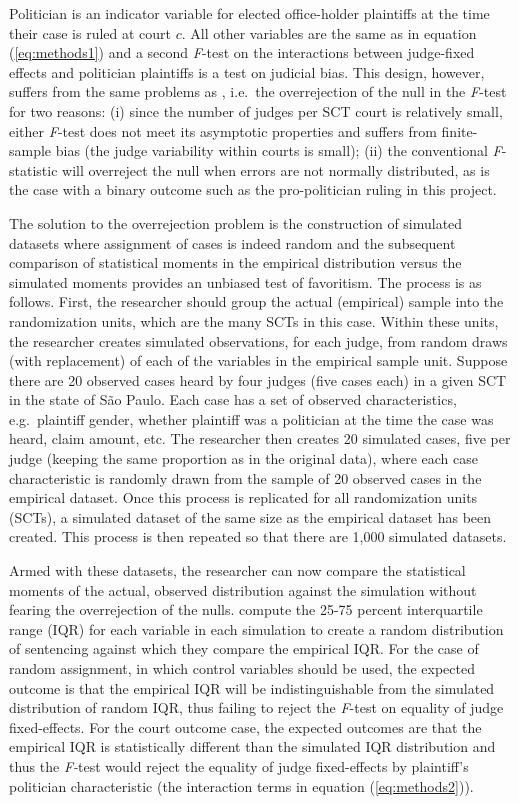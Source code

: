 \documentclass[11pt]{article}
\newcommand{\refp}[1]{(\ref{#1})}
\begin{document}
Politician is an indicator variable for elected office-holder plaintiffs at the time their case is ruled at court $c$. All other variables are the same as in equation \refp{eq:methods1} and a second \emph{F}-test on the interactions between judge-fixed effects and politician plaintiffs is a test on judicial bias. This design, however, suffers from the same problems as \citet{AbramsJudgesVaryTheir2012}, i.e.~the overrejection of the null in the \emph{F}-test for two reasons: (i) since the number of judges per SCT court is relatively small, either \emph{F}-test does not meet its asymptotic properties and suffers from finite-sample bias (the judge variability within courts is small); (ii) the conventional \emph{F}-statistic will overreject the null when errors are not normally distributed, as is the case with a binary outcome such as the pro-politician ruling in this project.

The solution to the overrejection problem is the construction of simulated datasets where assignment of cases is indeed random and the subsequent comparison of statistical moments in the empirical distribution versus the simulated moments provides an unbiased test of favoritism. The process is as follows. First, the researcher should group the actual (empirical) sample into the randomization units, which are the many SCTs in this case. Within these units, the researcher creates simulated observations, for each judge, from random draws (with replacement) of each of the variables in the empirical sample unit. Suppose there are 20 observed cases heard by four judges (five cases each) in a given SCT in the state of São Paulo. Each case has a set of observed characteristics, e.g.~plaintiff gender, whether plaintiff was a politician at the time the case was heard, claim amount, etc. The researcher then creates 20 simulated cases, five per judge (keeping the same proportion as in the original data), where each case characteristic is randomly drawn from the sample of 20 observed cases in the empirical dataset. Once this process is replicated for all randomization units (SCTs), a simulated dataset of the same size as the empirical dataset has been created. This process is then repeated so that there are 1,000 simulated datasets.

Armed with these datasets, the researcher can now compare the statistical moments of the actual, observed distribution against the simulation without fearing the overrejection of the nulls. \citet{AbramsJudgesVaryTheir2012} compute the 25-75 percent interquartile range (IQR) for each variable in each simulation to create a random distribution of sentencing against which they compare the empirical IQR. For the case of random assignment, in which control variables should be used, the expected outcome is that the empirical IQR will be indistinguishable from the simulated distribution of random IQR, thus failing to reject the \emph{F}-test on equality of judge fixed-effects. For the court outcome case, the expected outcomes are that the empirical IQR is statistically different than the simulated IQR distribution and thus the \emph{F-}test would reject the equality of judge fixed-effects by plaintiff's politician characteristic (the interaction terms in equation \refp{eq:methods2}).
\end{document}

